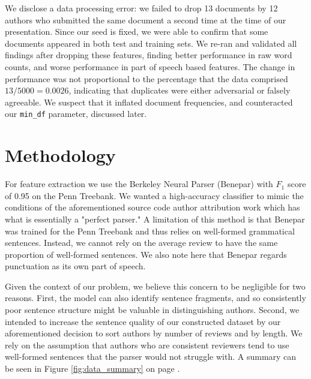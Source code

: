 \documentclass[11pt,a4paper]{article}
\begin{document}
We disclose a data processing error: we failed to drop 13 documents by 12 authors who submitted the same document a second time at the time of our presentation. Since our seed is fixed, we were able to confirm that some documents appeared in both test and training sets. We re-ran and validated all findings after dropping these features, finding better performance in raw word counts, and worse performance in part of speech based features. The change in performance was not proportional to the percentage that the data comprised $13/5000 = 0.0026$, indicating that duplicates were either adversarial or falsely agreeable. We suspect that it inflated document frequencies, and counteracted our \verb|min_df| parameter, discussed later.
\section{Methodology}
For feature extraction we use the Berkeley Neural Parser (Benepar) with $F_1$ score of 0.95 on the Penn Treebank. We wanted a high-accuracy classifier to mimic the conditions of the aforementioned source code author attribution work which has what is essentially a "perfect parser." A limitation of this method is that Benepar was trained for the Penn Treebank and thus relies on well-formed grammatical sentences. Instead, we cannot rely on the average review to have the same proportion of well-formed sentences. We also note here that Benepar regards punctuation as its own part of speech.

Given the context of our problem, we believe this concern to be negligible for two reasons. First, the model can also identify sentence fragments, and so consistently poor sentence structure might be valuable in distinguishing authors. Second, we intended to increase the sentence quality of our constructed dataset by our aforementioned decision to sort authors by number of reviews and by length. We rely on the assumption that authors who are consistent reviewers tend to use well-formed sentences that the parser would not struggle with. A summary can be seen in Figure \ref{fig:data_summary} on page \pageref{fig:data_summary}.
\end{document}
